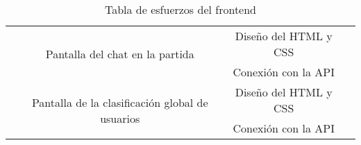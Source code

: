 \documentclass[11pt, a4paper, titlepage]{article}
\begin{document}
\begin{landscape}
\begin{table}[hbt!]
\begin{tabular}{c|ccll|cc|}
\multicolumn{1}{|c|}{}                            & \multicolumn{1}{c|}{\multirow{2}{*}{Pantalla del chat en la partida}}                                           & \multicolumn{3}{c|}{Diseño del HTML y CSS}                                                                     & \multicolumn{2}{c|}{}                                                        \\ \cline{3-5}
\multicolumn{1}{|c|}{}                            & \multicolumn{1}{c|}{}                                                                                           & \multicolumn{3}{c|}{Conexión con la API}                                                                       & \multicolumn{2}{c|}{}                                                        \\ \cline{2-5}
\multicolumn{1}{|c|}{}                            & \multicolumn{1}{c|}{\multirow{2}{*}{Pantalla de la clasificación global de usuarios}}                           & \multicolumn{3}{c|}{Diseño del HTML y CSS}                                                                     & \multicolumn{2}{c|}{}                                                        \\ \cline{3-5}
\multicolumn{1}{|c|}{}                            & \multicolumn{1}{c|}{}                                                                                           & \multicolumn{3}{c|}{Conexión con la API}                                                                       & \multicolumn{2}{c|}{}                                                        \\ \hline
\end{tabular}
\caption{Tabla de esfuerzos del frontend}
\label{table:frontend}
\end{table}
\end{landscape}
\FloatBarrier

\newpage
\end{document}
